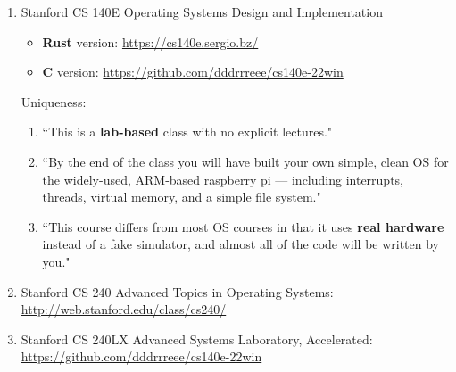 \documentclass{article}
\begin{document}
\begin{enumerate}
    \item Stanford CS 140E Operating Systems Design and Implementation
    \begin{itemize}
        \item \textbf{Rust} version:
        \href{https://cs140e.sergio.bz/}{https://cs140e.sergio.bz/}
        \item \textbf{C} version:
        \href{https://github.com/dddrrreee/cs140e-22win}{https://github.com/dddrrreee/cs140e-22win}
    \end{itemize}
    Uniqueness:
    \begin{enumerate}
        \item ``This is a \textbf{lab-based} class with no explicit lectures."
        \item ``By the end of the class you will have built your own simple, clean OS for the widely-used, ARM-based raspberry pi --- including interrupts, threads, virtual memory, and a simple file system."
        \item ``This course differs from most OS courses in that it uses \textbf{real hardware} instead of a fake simulator, and almost all of the code will be written by you."
    \end{enumerate}
    \item Stanford CS 240 Advanced Topics in Operating Systems:\\
    \href{http://web.stanford.edu/class/cs240/}{http://web.stanford.edu/class/cs240/}
    \item Stanford CS 240LX Advanced Systems Laboratory, Accelerated:\\
    \href{https://github.com/dddrrreee/cs140e-22win}{https://github.com/dddrrreee/cs140e-22win}
    

\end{enumerate}
\end{document}
